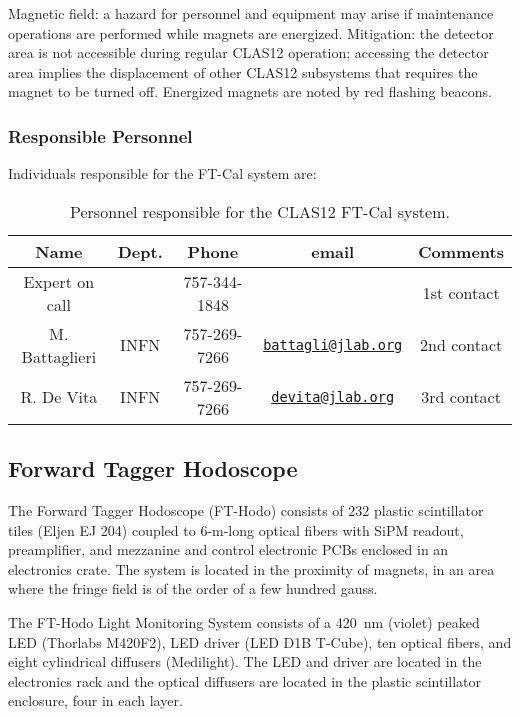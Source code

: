 Magnetic field: a hazard for personnel and equipment may arise if maintenance operations are 
performed while magnets are energized. Mitigation: the detector area is not accessible during 
regular CLAS12 operation; accessing the detector area implies the displacement of other CLAS12 
subsystems that requires the magnet to be turned off. Energized magnets are noted by red flashing 
beacons.

\vfil
\eject

\subsubsection{Responsible Personnel}

Individuals responsible for the FT-Cal system are:

\begin{table}[!htb]
\centering
\begin{tabular}{|c|c|c|c|c|} \hline
Name&Dept.&Phone&email&Comments \\ \hline
Expert on call& & 757-344-1848 && 1st contact \\ \hline
M. Battaglieri& INFN&757-269-7266&\href{mailto:battagli@jlab.org}{\nolinkurl{battagli@jlab.org}}&2nd contact \\ \hline
R. De Vita & INFN&757-269-7266&\href{mailto:devita@jlab.org}{\nolinkurl{devita@jlab.org}}& 3rd contact  \\ \hline
\end{tabular}
\caption{Personnel responsible for the CLAS12 FT-Cal system.} 
\label{tb:ecal}
\end{table}

\subsection{Forward Tagger Hodoscope}

The Forward Tagger Hodoscope (FT-Hodo) consists of $232$ plastic scintillator tiles (Eljen 
EJ 204) coupled to 6-m-long optical fibers with SiPM readout, preamplifier, and mezzanine 
and control electronic PCBs enclosed in an electronics crate. The system is located in the 
proximity of magnets, in an area where the fringe field is of the order of a few hundred gauss.

The FT-Hodo Light Monitoring System consists of a 420~nm (violet) peaked LED (Thorlabs M420F2), 
LED driver (LED D1B T-Cube), ten optical fibers, and eight cylindrical diffusers (Medilight). 
The LED and driver are located in the electronics rack and the optical diffusers are located 
in the plastic scintillator enclosure, four in each layer.

